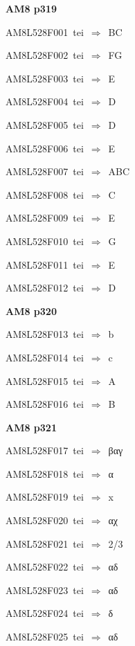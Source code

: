 \par\vfill\eject
{\bf\hfill AM8 p319\hfill\hbox{}}\par\bigskip
{\sixrm AM8L528F001\ {\sixit tei}\ }$\Rightarrow$\ BC\par\smallskip
{\sixrm AM8L528F002\ {\sixit tei}\ }$\Rightarrow$\ FG\par\smallskip
{\sixrm AM8L528F003\ {\sixit tei}\ }$\Rightarrow$\ E\par\smallskip
{\sixrm AM8L528F004\ {\sixit tei}\ }$\Rightarrow$\ D\par\smallskip
{\sixrm AM8L528F005\ {\sixit tei}\ }$\Rightarrow$\ D\par\smallskip
{\sixrm AM8L528F006\ {\sixit tei}\ }$\Rightarrow$\ E\par\smallskip
{\sixrm AM8L528F007\ {\sixit tei}\ }$\Rightarrow$\ ABC\par\smallskip
{\sixrm AM8L528F008\ {\sixit tei}\ }$\Rightarrow$\ C\par\smallskip
{\sixrm AM8L528F009\ {\sixit tei}\ }$\Rightarrow$\ E\par\smallskip
{\sixrm AM8L528F010\ {\sixit tei}\ }$\Rightarrow$\ G\par\smallskip
{\sixrm AM8L528F011\ {\sixit tei}\ }$\Rightarrow$\ E\par\smallskip
{\sixrm AM8L528F012\ {\sixit tei}\ }$\Rightarrow$\ D\par\smallskip

\par\vfill\eject
{\bf\hfill AM8 p320\hfill\hbox{}}\par\bigskip
{\sixrm AM8L528F013\ {\sixit tei}\ }$\Rightarrow$\ {\tenit b}\par\smallskip
{\sixrm AM8L528F014\ {\sixit tei}\ }$\Rightarrow$\ {\tenit c}\par\smallskip
{\sixrm AM8L528F015\ {\sixit tei}\ }$\Rightarrow$\ A\par\smallskip
{\sixrm AM8L528F016\ {\sixit tei}\ }$\Rightarrow$\ B\par\smallskip

\par\vfill\eject
{\bf\hfill AM8 p321\hfill\hbox{}}\par\bigskip
{\sixrm AM8L528F017\ {\sixit tei}\ }$\Rightarrow$\ βαγ\par\smallskip
{\sixrm AM8L528F018\ {\sixit tei}\ }$\Rightarrow$\ α\par\smallskip
{\sixrm AM8L528F019\ {\sixit tei}\ }$\Rightarrow$\ {\tenit x}\par\smallskip
{\sixrm AM8L528F020\ {\sixit tei}\ }$\Rightarrow$\ αχ\par\smallskip
{\sixrm AM8L528F021\ {\sixit tei}\ }$\Rightarrow$\ 2/3\par\smallskip
{\sixrm AM8L528F022\ {\sixit tei}\ }$\Rightarrow$\ αδ\par\smallskip
{\sixrm AM8L528F023\ {\sixit tei}\ }$\Rightarrow$\ αδ\par\smallskip
{\sixrm AM8L528F024\ {\sixit tei}\ }$\Rightarrow$\ δ\par\smallskip
{\sixrm AM8L528F025\ {\sixit tei}\ }$\Rightarrow$\ αδ\par\smallskip

